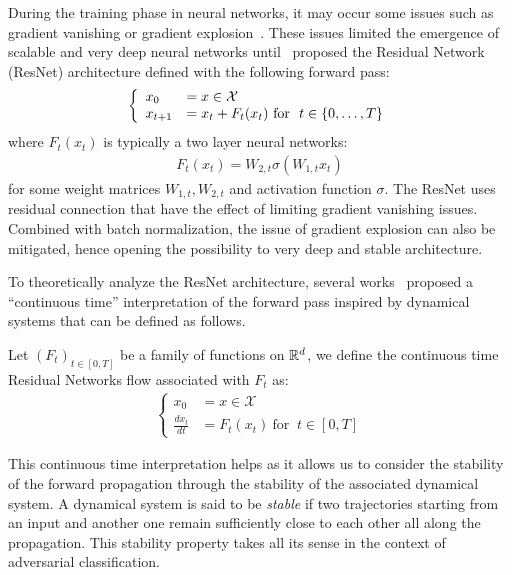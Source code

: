 During the training phase in neural networks, it may occur some issues such as gradient vanishing or gradient explosion~\citep{hochreiter2001gradient}. These issues limited the emergence of scalable and very deep neural networks until~\cite{he2016deep} proposed the Residual Network (ResNet) architecture defined with the following forward pass: 
\begin{align*}
  \left\{
    \begin{array}{ll}
    x_0 &= x\in\XX\\
    x_{t+1} &= x_t+F_{{t}}(x_{t}) \  \text{for } \ t\in\{0, \dots,T\}
  \end{array}
  \right.
\end{align*}
where $F_{{t}}(x_{t})$ is typically a two layer neural networks:
\begin{align*}
  F_{{t}}(x_{t}) = W_{2,t}\sigma(W_{1,t}x_t)
\end{align*} 
for some weight matrices $ W_{1,t},  W_{2,t}$ and activation function $\sigma$. The ResNet uses residual connection that have the effect of limiting gradient vanishing issues. Combined with batch normalization, the issue of gradient explosion can also be mitigated, hence opening the possibility to very deep and stable architecture. 

To theoretically analyze the ResNet architecture, several works~\citep{haber2017stable,e17Proposal,lu18beyond,chen2018neural} proposed a ``continuous time'' interpretation of the forward pass inspired by dynamical systems that can be defined as follows.

\begin{definition}\label{def:flow}
Let $(F_{t})_{t\in[0,T]}$ be a family of functions on $\mathbb{R}^d$, we define the continuous time Residual Networks flow associated with $F_t$ as:
\begin{align*}
  \left\{
    \begin{array}{ll}
    x_0 &= x\in\mathcal{X}\\
    \frac{dx_{t}}{dt} &= F_{{t}}(x_{t}) \  \text{for } \ t\in[0, T]
  \end{array}
  \right.
\end{align*}
\end{definition}

This continuous time interpretation helps as it allows us to consider the stability of the forward propagation through the stability of the associated dynamical system.
A dynamical system is said to be \emph{stable} if two trajectories starting from an input and another one remain sufficiently close to each other all along the propagation. This stability property takes all its sense in the context of adversarial classification.

